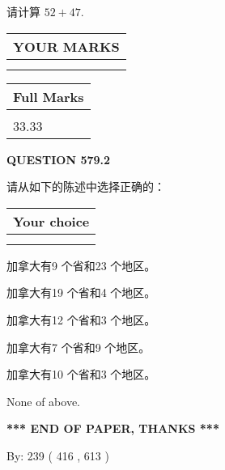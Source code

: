 \documentclass{ctexart}
\begin{document}
  
 
请计算 $ %
52 +  %
47 $.
 

 

 
  
\vspace{0.2in}
  
\noindent\begin{tabular}{|l|}
\hline
 YOUR MARKS  \\
\hline
 \\ 
 \\ 
\hline
\end{tabular}
\hspace{0.05in} \begin{tabular}{|l|}
\hline
 Full Marks  \\
\hline
 \\ 
33.33 \\
\hline
\end{tabular}
{\textbf{\Large{QUESTION
579.2 
}}}
  
  
请从如下的陈述中选择正确的：
  
  
\noindent\hspace{3.0in} \begin{tabular}{|l|}
\hline
Your choice \\
\hline
 \\ 
 \\ 
\hline
\end{tabular}
  
  
 
 
加拿大有9 个省和23 个地区。
 
 
加拿大有19 个省和4 个地区。
 
 
加拿大有12 个省和3 个地区。
 
 
加拿大有7 个省和9 个地区。
 
 
加拿大有10 个省和3 个地区。
 
 
 None of above.
 
 
   
   
 \vspace{0.2in}
 
   
   
   
   
\vspace{1.0in} 
{\textbf{\large{ *** END OF PAPER, THANKS *** }}} 
   
   
\hspace{1.0in} By: 
 239 ( 416 ,  613 )
   
\end{document}
